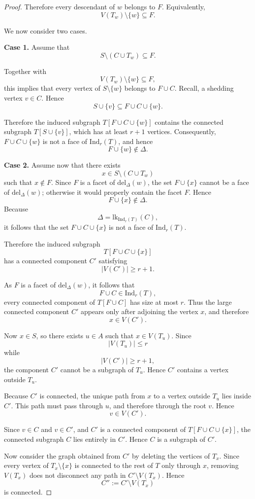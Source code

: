 \documentclass[10pt,a4paper]{amsart}
\def\Ind{\mathrm{Ind}}
\def\del{\mathrm{del}}
\def\lk{\mathrm{lk}}
\begin{document}
\begin{proof}
Therefore every descendant of \(w\) belongs to \(F\). Equivalently,
\[
V(T_w)\setminus\{w\}\subseteq F.
\]

We now consider two cases.

\medskip
\noindent
\textbf{Case 1.}
Assume that
\[
S\setminus(C\cup T_w)\subseteq F.
\]

Together with
\[
V(T_w)\setminus\{w\}\subseteq F,
\]
this implies that every vertex of \(S\setminus\{w\}\) belongs to \(F\cup C\). Recall, a shedding vertex $v \in C$. Hence
\[
S\cup\{v\}\subseteq F\cup C\cup\{w\}.
\]

Therefore the induced subgraph $T[F\cup C\cup\{w\}]$ contains the connected subgraph $T[S\cup\{v\}]$, which has at least \(r+1\) vertices. Consequently, $F\cup C\cup\{w\}$ is not a face of $\Ind_r(T)$, and hence
\[
F\cup\{w\}\notin\Delta.
\]

\medskip
\noindent
\textbf{Case 2.}
Assume now that there exists
\[
x\in S\setminus(C\cup T_w)
\]
such that $x\notin F$. Since \(F\) is a facet of \(\del_\Delta(w)\), the set $F\cup\{x\}$
cannot be a face of \(\del_\Delta(w)\); otherwise it would properly contain the facet \(F\). Hence
\[
F\cup\{x\}\notin\Delta.
\]
Because
\[
\Delta=\lk_{\Ind_r(T)}(C),
\]
it follows that the set $F\cup C\cup\{x\}$ is not a face of $\Ind_r(T)$.

Therefore the induced subgraph
\[
T[F\cup C\cup\{x\}]
\]
has a connected component \(C'\) satisfying
\[
|V(C')|\ge r+1.
\]

As $F$ is a facet of $\del_{\Delta}(w)$, it follows that
\[
F\cup C\in\Ind_r(T),
\]
every connected component of $T[F\cup C]$ has size at most \(r\). Thus the large connected component \(C'\) appears only after adjoining
the vertex \(x\), and therefore
\[
x\in V(C').
\]

Now $x\in S$,
so there exists \(u\in A\) such that $x\in V(T_u)$.
Since
\[
|V(T_u)|\le r
\]
while
\[
|V(C')|\ge r+1,
\]
the component \(C'\) cannot be a subgraph of \(T_u\). Hence \(C'\) contains a
vertex outside \(T_u\).

Because \(C'\) is connected, the unique path from \(x\) to a vertex outside \(T_u\) lies inside
\(C'\). This path must pass through \(u\), and therefore through the root \(v\). Hence
\[
v\in V(C').
\]

Since \(v \in C\) and \(v \in C'\), and \(C'\) is a connected component of \(T[F \cup C \cup \{x\}]\), the connected subgraph $C$ lies entirely in \(C'\). Hence $C$ is a subgraph of $C'$.

Now consider the graph obtained from \(C'\) by deleting the vertices of $T_x$.
Since every vertex of \(T_x \setminus \{x\}\) is connected to the rest of \(T\) only through \(x\), removing \(V(T_x)\) does not disconnect any path in \(C' \setminus V(T_x)\). Hence
\[
C'' := C' \setminus V(T_x)
\]
is connected.


\end{proof}
\end{document}
